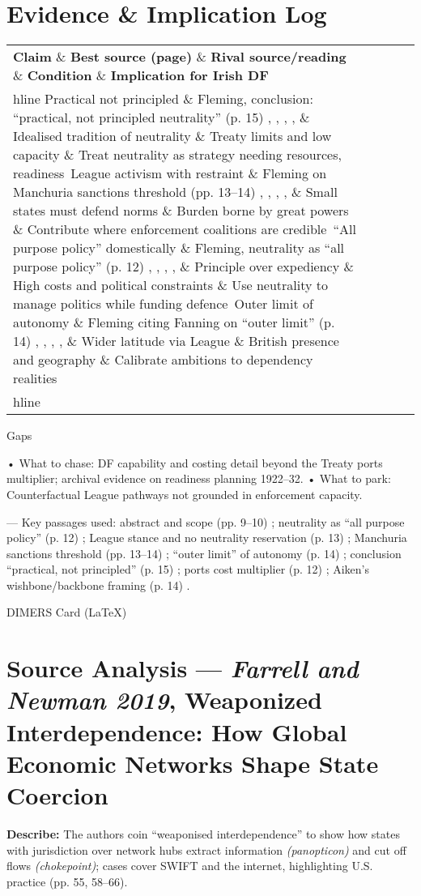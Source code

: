 \section*{Evidence \& Implication Log}
\begin{tabular}{p{3.2cm}p{4.2cm}p{3.6cm}p{3.2cm}p{4.2cm}}
	\textbf{Claim} \& \textbf{Best source (page)} \& \textbf{Rival source/reading} \& \textbf{Condition} \& \textbf{Implication for Irish DF}\\hline
	Practical not principled \& Fleming, conclusion: “practical, not principled neutrality” (p. 15) , , , , \& Idealised tradition of neutrality \& Treaty limits and low capacity \& Treat neutrality as strategy needing resources, readiness\
	League activism with restraint \& Fleming on Manchuria sanctions threshold (pp. 13–14) , , , , \& Small states must defend norms \& Burden borne by great powers \& Contribute where enforcement coalitions are credible\
	“All purpose policy” domestically \& Fleming, neutrality as “all purpose policy” (p. 12) , , , , \& Principle over expediency \& High costs and political constraints \& Use neutrality to manage politics while funding defence\
	Outer limit of autonomy \& Fleming citing Fanning on “outer limit” (p. 14) , , , , \& Wider latitude via League \& British presence and geography \& Calibrate ambitions to dependency realities\\hline
\end{tabular}

Gaps

• What to chase: DF capability and costing detail beyond the Treaty ports multiplier; archival evidence on readiness planning 1922–32.
• What to park: Counterfactual League pathways not grounded in enforcement capacity.

—
Key passages used: abstract and scope (pp. 9–10) ; neutrality as “all purpose policy” (p. 12) ; League stance and no neutrality reservation (p. 13) ; Manchuria sanctions threshold (pp. 13–14) ; “outer limit” of autonomy (p. 14) ; conclusion “practical, not principled” (p. 15) ; ports cost multiplier (p. 12) ; Aiken’s wishbone/backbone framing (p. 14) .


\parencite{FARRELL_2019} DIMERS Card (LaTeX)

\section*{Source Analysis — \textit{Farrell and Newman 2019}, Weaponized Interdependence: How Global Economic Networks Shape State Coercion}
\textbf{Describe:} The authors coin “weaponised interdependence” to show how states with jurisdiction over network hubs extract information \textit{(panopticon)} and cut off flows \textit{(chokepoint)}; cases cover SWIFT and the internet, highlighting U.S. practice (pp. 55, 58–66).

